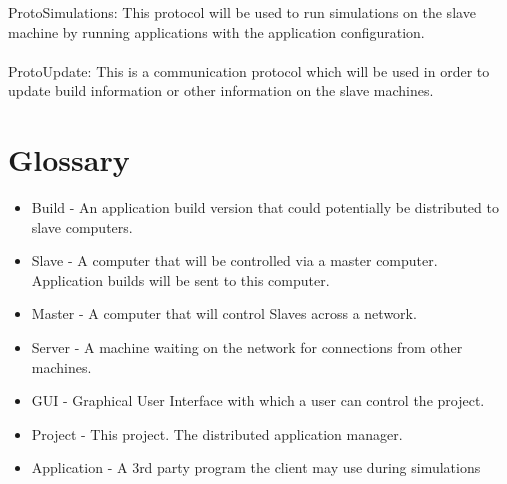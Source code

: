 \documentclass[a4paper,12pt,final]{article}
\begin{document}
ProtoSimulations: This protocol will be used to run simulations on the slave machine by running
applications with the application configuration.\\
\textbf{\\}
ProtoUpdate: This is a communication protocol which will be used in order to update build
information or other information on the slave machines.



\newpage
\section{Glossary}
\begin{itemize}
\item{Build - An application build version that could potentially be distributed to slave computers.}
\item{Slave - A computer that will be controlled via a master computer. Application builds will be sent to this computer.}
\item{Master - A computer that will control Slaves across a network.}
\item{Server - A machine waiting on the network for connections from other machines.}
\item{GUI - Graphical User Interface with which a user can control the project.}
\item{Project - This project. The distributed application manager.}
\item{Application - A 3rd party program the client may use during simulations}
\end{itemize}
\end{document}
